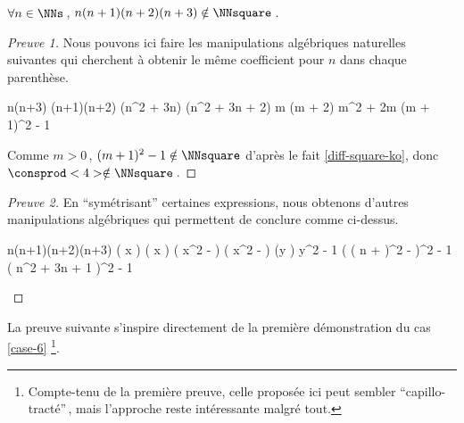 \begin{fact} \label{case-4}
	 $\forall n \in \NNs$\,, $n(n+1)(n+2)(n+3) \notin \NNsquare$\,.
\end{fact}




\begin{proof}[Preuve 1]
    Nous pouvons ici faire les manipulations algébriques naturelles suivantes qui cherchent à obtenir le même coefficient pour $n$ dans chaque parenthèse.
    
    \medskip
    
    \begin{stepcalc}[style = sar]
    \explnext{}
    	n(n+3) \cdot (n+1)(n+2)
    \explnext{}
    	(n^2 + 3n) \cdot (n^2 + 3n + 2)
    	m (m + 2)
    \explnext{}
    	m^2 + 2m
    \explnext{}
    	(m + 1)^2 - 1
    \end{stepcalc}
    
    \medskip
    
    Comme $m > 0$\,, $(m + 1)^2 - 1 \notin \NNsquare$ d'après le fait \ref{diff-square-ko}, donc $\consprod<4> \notin \NNsquare$\,. 
\end{proof}




\begin{proof}[Preuve 2]
	En \enquote{symétrisant} certaines expressions, nous obtenons d'autres manipulations algébriques qui permettent de conclure comme ci-dessus.
    
    \medskip
    
    \begin{stepcalc}[style = sar]
    \explnext{}
    	n(n+1)(n+2)(n+3)
    	\big( x \pm {} \big) \big( x \pm {} \big)
    \explnext{}
    	\big( x^2 -  \big) \big( x^2 -  \big)
    	(y )
    \explnext{}
    	y^2 - 1
    \explnext{}
    	\Big( \big( n +  \big)^2 -  \Big)^2 - 1
    \explnext{}
    	\big( n^2 + 3n + 1 \big)^2 - 1
    \end{stepcalc}

    \vspace{-1.5ex}
    \qedhere
\end{proof}




La preuve suivante s'inspire directement de la première démonstration du cas \ref{case-6}
\footnote{
	Compte-tenu de la première preuve, celle proposée ici peut sembler \enquote{capillo-tracté}\,, mais l'approche reste intéressante malgré tout.
}.


